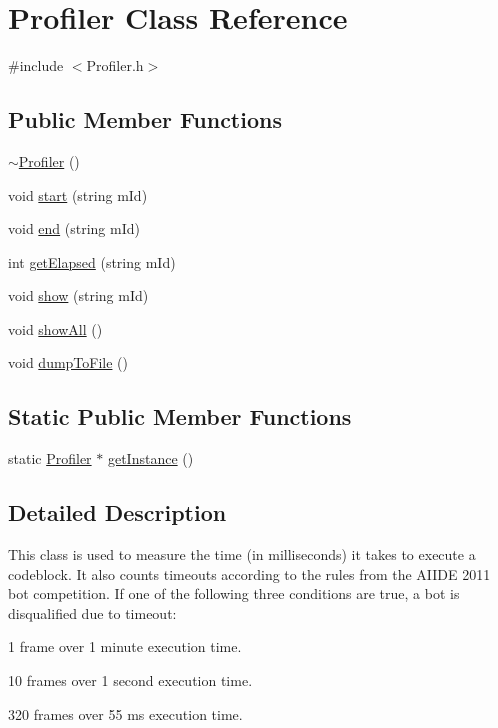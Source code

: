 \hypertarget{class_profiler}{\section{Profiler Class Reference}
\label{class_profiler}
}


{\ttfamily \#include $<$Profiler.\-h$>$}

\subsection*{Public Member Functions}
\begin{DoxyCompactItemize}
\item 
\hyperlink{class_profiler_a1e6dd8f6cfb15cd5237b971d8f49c749}{$\sim$\-Profiler} ()
\item 
void \hyperlink{class_profiler_a1ce83214365a585ed3f153ed866ee82c}{start} (string m\-Id)
\item 
void \hyperlink{class_profiler_a4e472f005b263f31c48347a5ffe2be1c}{end} (string m\-Id)
\item 
int \hyperlink{class_profiler_adce9cbeb54ff79cf84591c9615e846f6}{get\-Elapsed} (string m\-Id)
\item 
void \hyperlink{class_profiler_ac0ea0fb4ff66e52550346325715158ca}{show} (string m\-Id)
\item 
void \hyperlink{class_profiler_a7db0d96159f7fc6bf4eafed1937e372f}{show\-All} ()
\item 
void \hyperlink{class_profiler_a2d4ae87fd9e73e10d9b5661c8993fc45}{dump\-To\-File} ()
\end{DoxyCompactItemize}
\subsection*{Static Public Member Functions}
\begin{DoxyCompactItemize}
\item 
static \hyperlink{class_profiler}{Profiler} $\ast$ \hyperlink{class_profiler_a76416c548328c4e83c25bcc68a93f139}{get\-Instance} ()
\end{DoxyCompactItemize}


\subsection{Detailed Description}
This class is used to measure the time (in milliseconds) it takes to execute a codeblock. It also counts timeouts according to the rules from the A\-I\-I\-D\-E 2011 bot competition. If one of the following three conditions are true, a bot is disqualified due to timeout\-:
\begin{DoxyItemize}
\item 1 frame over 1 minute execution time.
\item 10 frames over 1 second execution time.
\item 320 frames over 55 ms execution time.
\end{DoxyItemize}

